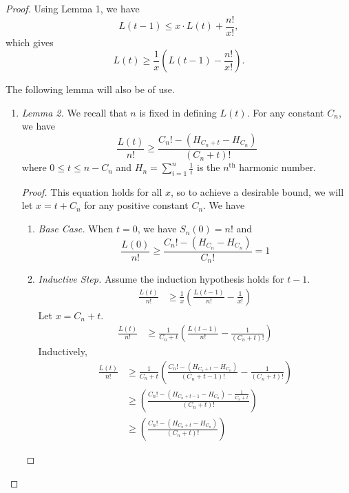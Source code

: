 \documentclass[12pt, a4paper]{article}
\newcommand{\nth}{^{\text{th}}}       %
\begin{document}
\begin{proof}
		Using Lemma 1, we have
		\begin{equation*}
			L(t-1) \le x\cdot L(t) + \frac{n!}{x!},
		\end{equation*}
		which gives
		\begin{equation*}
			L(t)\ge \frac{1}{x}\left(L(t-1)-\frac{n!}{x!}\right).
		\end{equation*}
		
		The following lemma will also be of use.
		\begin{enumerate}[label=]
			\item\textit{Lemma 2.} We recall that $n$ is fixed in defining $L(t)$. For any constant $C_n$, we have
			\begin{equation*}
				\frac{L(t)}{n!}\ge \frac{C_{n}! - (H_{C_{n}+t} - H_{C_{n}})}{(C_n+t)!}
			\end{equation*}
			where $0\le t\le n-C_{n}$ and $H_n=\sum_{i = 1}^n\frac{1}{i}$ is the $n\nth$ harmonic number.
		\begin{proof}
			This equation holds for all $x$, so to achieve a desirable bound, we will
		let $x=t+C_{n}$ for any positive constant $C_{n}$. We have
		\begin{enumerate}[label=]
		\item\textit{Base Case.} When $t=0$, we have $S_n(0)= n!$ and
			\begin{equation*}
			\frac{L(0)}{n!}\ge \frac{C_{n}! - (H_{C_{n}}-H_{C_{n}})}{C_{n}!} = 1
			\end{equation*}
			
		\item \textit{Inductive Step.} Assume the induction hypothesis holds for $t-1$.
			\begin{align*}
			\frac{L(t)}{n!}
			& \ge \frac{1}{x}\left(\frac{L(t-1)}{n!}-\frac{1}{x!}\right)
			\end{align*}
		Let $x=C_{n}+t$.
			\begin{align*}
			\frac{L(t)}{n!}
			& \ge \frac{1}{C_{n}+t}\left(\frac{L(t-1)}{n!}
			-\frac{1}{(C_{n}+t)!}\right)
			\end{align*}
		Inductively,
			\begin{align*}
			\frac{L(t)}{n!}
			& \ge \frac{1}{C_{n}+t}\left(\frac{C_{n}!-(H_{C_{n}+t} - H_{C_{n}})}
			{(C_{n}+t-1)!} - \frac{1}{(C_{n}+t)!}\right)\\
			& \ge \left(\frac{C_{n}! - (H_{C_{n}+t-1} - H_{C_{n}}) - \frac{1}{C_{n}+t}}
			{(C_{n}+t)!}\right)\\
			& \ge \left(\frac{C_{n}! - (H_{C_{n}+t} - H_{C_{n}})}{(C_{n}+t)!}\right)
			\end{align*}
			

\end{enumerate}
\end{proof}
\end{enumerate}
\end{proof}
\end{document}
